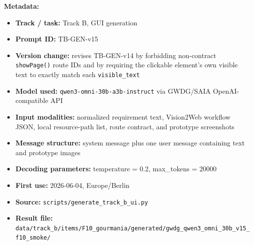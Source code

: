 \textbf{Metadata:}
\begin{itemize}
  \item \textbf{Track / task:} Track B, GUI generation
  \item \textbf{Prompt ID:} TB-GEN-v15
  \item \textbf{Version change:} revises TB-GEN-v14 by forbidding
  non-contract \texttt{showPage()} route IDs and by requiring the clickable
  element's own visible text to exactly match each \texttt{visible\_text}
  \item \textbf{Model used:} \texttt{qwen3-omni-30b-a3b-instruct} via
  GWDG/SAIA OpenAI-compatible API
  \item \textbf{Input modalities:} normalized requirement text, Vision2Web
  workflow JSON, local resource-path list, route contract, and prototype
  screenshots
  \item \textbf{Message structure:} system message plus one user message
  containing text and prototype images
  \item \textbf{Decoding parameters:} temperature = 0.2, max\_tokens = 20000
  \item \textbf{First use:} 2026-06-04, Europe/Berlin
  \item \textbf{Source:} \texttt{scripts/generate\_track\_b\_ui.py}
  \item \textbf{Result file:}
  \texttt{data/track\_b/items/F10\_gourmania/generated/gwdg\_qwen3\_omni\_30b\_v15\_f10\_smoke/}
\end{itemize}

